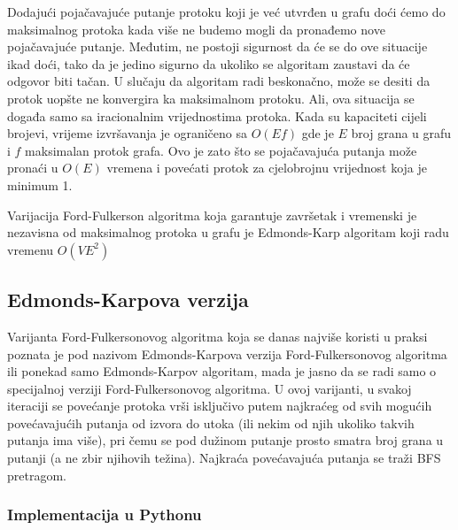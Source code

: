 \documentclass[11pt, a4paper]{article}
\begin{document}
	Dodajući pojačavajuće putanje protoku koji je već utvrđen u grafu doći ćemo do maksimalnog protoka kada više ne budemo mogli da pronađemo nove pojačavajuće putanje. Međutim, ne postoji sigurnost da će se do ove situacije ikad doći, tako da je jedino sigurno da ukoliko se algoritam zaustavi da će odgovor biti tačan. U slučaju da algoritam radi beskonačno, može se desiti da protok uopšte ne konvergira ka maksimalnom protoku. Ali, ova situacija se događa samo sa iracionalnim vrijednostima protoka. Kada su kapaciteti cijeli brojevi, vrijeme izvršavanja je ograničeno sa $O(Ef)$ gde je $E$ broj grana u grafu i $f$ maksimalan protok grafa. Ovo je zato što se pojačavajuća putanja može pronaći u $O(E)$ vremena i povećati protok za cjelobrojnu vrijednost koja je minimum 1.
	
	Varijacija Ford-Fulkerson algoritma koja garantuje završetak i vremenski je nezavisna od maksimalnog protoka u grafu je Edmonds-Karp algoritam koji radu vremenu $O(VE^2)$
	
	\subsection{Edmonds-Karpova verzija}
	
	Varijanta Ford-Fulkersonovog algoritma koja se danas najviše koristi u praksi poznata je pod nazivom
	Edmonds-Karpova verzija Ford-Fulkersonovog algoritma ili ponekad samo Edmonds-Karpov algoritam,
	mada je jasno da se radi samo o specijalnoj verziji Ford-Fulkersonovog algoritma. U ovoj varijanti, u svakoj
	iteraciji se povećanje protoka vrši isključivo putem najkraćeg od svih mogućih povećavajućih putanja od
	izvora do utoka (ili nekim od njih ukoliko takvih putanja ima više), pri čemu se pod dužinom putanje prosto
	smatra broj grana u putanji (a ne zbir njihovih težina). Najkraća povećavajuća putanja se traži BFS pretragom.
	
	\subsubsection*{Implementacija u Pythonu}
	
\end{document}
